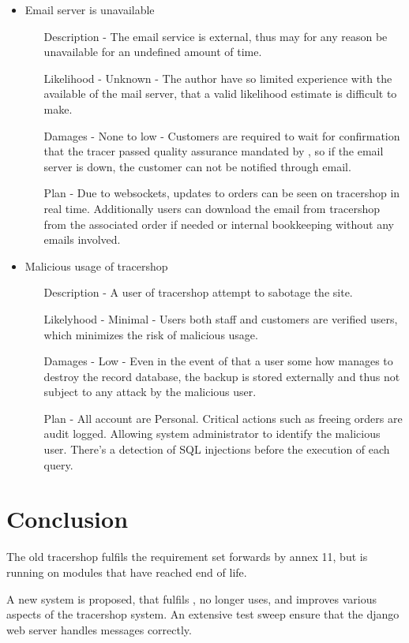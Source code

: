 \documentclass{article}
\begin{document}
\begin{itemize}
  \item Email server is unavailable
  \begin{itemize}
    \item[Description] - The email service is external, thus may for any reason be unavailable for an undefined amount of time.
    \item[Likelihood] - Unknown - The author have so limited experience with the available of the mail server, that a valid likelihood estimate is difficult to make.
    \item[Damages] - None to low - Customers are required to wait for confirmation that the tracer passed quality assurance mandated by , so if the email server is down, the customer can not be notified through email.
    \item[Plan] - Due to websockets, updates to orders can be seen on tracershop in real time. Additionally users can download the email from tracershop from the associated order if needed or internal bookkeeping without any emails involved.
  \end{itemize}
  \item Malicious usage of tracershop
  \begin{itemize}
    \item[Description] - A user of tracershop attempt to sabotage the site.
    \item[Likelyhood] - Minimal - Users both staff and customers are verified users, which minimizes the risk of malicious usage.
    \item[Damages] - Low - Even in the event of that a user some how manages to destroy the record database, the backup is stored externally and thus not subject to any attack by the malicious user.
    \item[Plan] - All account are Personal.
    Critical actions such as freeing orders are audit logged. Allowing system administrator to identify the malicious user.
    There's a detection of SQL injections before the execution of each query.
  \end{itemize}
\end{itemize}


\section*{Conclusion}
The old tracershop fulfils the requirement set forwards by  annex 11, but is running on modules that have reached end of life.

A new system is proposed, that fulfils , no longer uses, and improves various aspects of the tracershop system.
An extensive test sweep ensure that the django web server handles messages correctly.






\clearpage

\printglossary[type=main,style=long,nonumberlist]
\end{document}
